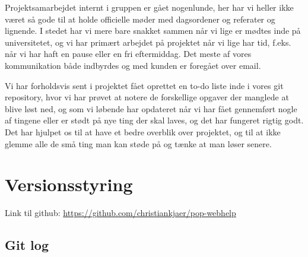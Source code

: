 \documentclass[11pt, a4paper]{article}
\begin{document}
Projektsamarbejdet internt i gruppen er gået nogenlunde, her har vi heller ikke været så gode til at holde officielle møder  med dagsordener og referater og lignende. I stedet har vi mere bare snakket sammen når vi lige er mødtes inde på universitetet, og vi har primært arbejdet på projektet når vi lige har tid, f.eks. når vi har haft en pause eller en fri eftermiddag. Det meste af vores kommunikation både indbyrdes og med kunden er foregået over email.

Vi har forholdsvis sent i projektet fået oprettet en to-do liste inde i vores git repository, hvor vi har prøvet at notere de forskellige opgaver der manglede at blive løst ned, og som vi løbende har opdateret når vi har fået gennemført nogle af tingene eller er stødt på nye ting der skal laves, og det har fungeret rigtig godt. Det har hjulpet os til at have et bedre overblik over projektet, og til at ikke glemme alle de små ting man kan støde på og tænke at man løser senere.

\newpage
\appendix
\section{Versionsstyring}
\label{sec:versionsstyring}
Link til github: \url{https://github.com/christiankjaer/pop-webhelp}

\subsection{Git log}
\label{sub:git_log}

\end{document}
